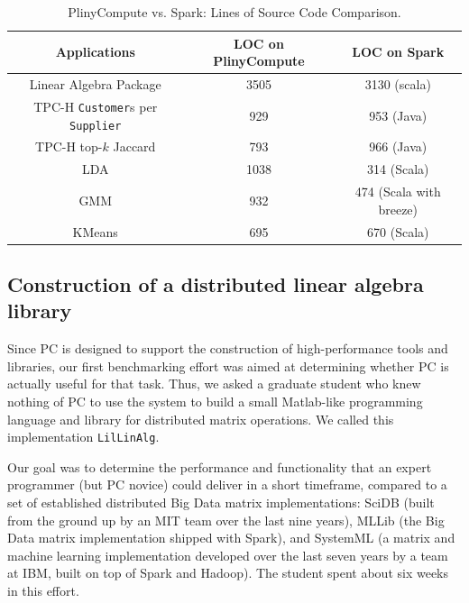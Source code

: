 \begin{table}[h!]
\begin{center}
\begin{tabular}{|c|c|c|}
\hline
Applications & LOC on PlinyCompute & LOC on Spark\\
\hline
Linear Algebra Package &3505& 3130 (scala)\\
TPC-H \texttt{Customer}s per \texttt{Supplier}&929 &953 (Java)\\
TPC-H top-$k$ Jaccard &793 & 966 (Java)\\
LDA &1038  &314 (Scala)\\
GMM&932 & 474 (Scala with breeze)\\
KMeans &695  &670 (Scala)\\
\hline
\end{tabular}
\caption{PlinyCompute vs. Spark: Lines of Source Code Comparison.}
\label{fig:LOC}
\end{center}
\end{table}





\subsection {Construction of a distributed linear algebra library}
Since PC is designed to support the construction
of high-performance tools and libraries, our first benchmarking effort was aimed at determining 
whether PC is actually useful for that task.  Thus, we asked
a graduate student who knew nothing of PC to use the system to build a small Matlab-like 
programming language and library for distributed matrix operations.
We called this implementation \texttt{LilLinAlg}.

Our goal was to determine the 
performance and functionality that an expert programmer (but PC novice) could deliver in a short
timeframe, compared to a set of established distributed Big Data matrix implementations:
SciDB \cite{brown2010overview, stonebraker2011architecture} (built from the ground up by an MIT team over the last nine years), MLLib \cite{meng2016mllib} 
(the Big Data matrix
implementation shipped with Spark), and SystemML \cite{boehm2014hybrid, ghoting2011systemml, boehm2016systemml}
(a matrix and machine learning implementation developed
over the last seven years by a team at IBM, built on top of Spark and Hadoop).
The student spent about six weeks in this effort.

